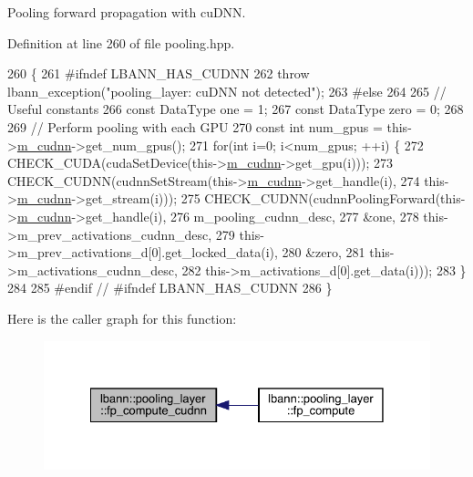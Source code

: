 Pooling forward propagation with cu\+D\+NN. 



Definition at line 260 of file pooling.\+hpp.


\begin{DoxyCode}
260                           \{
261 \textcolor{preprocessor}{  #ifndef LBANN\_HAS\_CUDNN}
262     \textcolor{keywordflow}{throw} lbann\_exception(\textcolor{stringliteral}{"pooling\_layer: cuDNN not detected"});
263 \textcolor{preprocessor}{  #else}
264 
265     \textcolor{comment}{// Useful constants}
266     \textcolor{keyword}{const} DataType one = 1;
267     \textcolor{keyword}{const} DataType zero = 0;
268 
269     \textcolor{comment}{// Perform pooling with each GPU}
270     \textcolor{keyword}{const} \textcolor{keywordtype}{int} num\_gpus = this->\hyperlink{classlbann_1_1Layer_a08dbb94239e3b8c96329786c57c72e21}{m\_cudnn}->get\_num\_gpus();
271     \textcolor{keywordflow}{for}(\textcolor{keywordtype}{int} i=0; i<num\_gpus; ++i) \{
272       CHECK\_CUDA(cudaSetDevice(this->\hyperlink{classlbann_1_1Layer_a08dbb94239e3b8c96329786c57c72e21}{m\_cudnn}->get\_gpu(i)));
273       CHECK\_CUDNN(cudnnSetStream(this->\hyperlink{classlbann_1_1Layer_a08dbb94239e3b8c96329786c57c72e21}{m\_cudnn}->get\_handle(i),
274                                  this->\hyperlink{classlbann_1_1Layer_a08dbb94239e3b8c96329786c57c72e21}{m\_cudnn}->get\_stream(i)));
275       CHECK\_CUDNN(cudnnPoolingForward(this->\hyperlink{classlbann_1_1Layer_a08dbb94239e3b8c96329786c57c72e21}{m\_cudnn}->get\_handle(i),
276                                       m\_pooling\_cudnn\_desc,
277                                       &one,
278                                       this->m\_prev\_activations\_cudnn\_desc,
279                                       this->m\_prev\_activations\_d[0].get\_locked\_data(i),
280                                       &zero,
281                                       this->m\_activations\_cudnn\_desc,
282                                       this->m\_activations\_d[0].get\_data(i)));
283     \}
284 
285 \textcolor{preprocessor}{  #endif // #ifndef LBANN\_HAS\_CUDNN}
286   \}
\end{DoxyCode}
Here is the caller graph for this function\+:\nopagebreak
\begin{figure}[H]
\begin{center}
\leavevmode
\includegraphics[width=328pt]{classlbann_1_1pooling__layer_a022eb4448992f654288b6b1ca95fcb6c_icgraph}
\end{center}
\end{figure}
